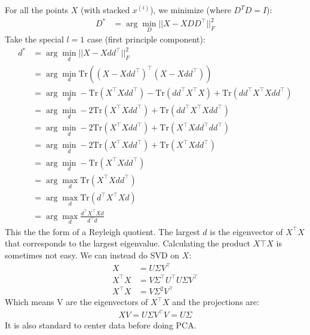 \documentclass{article}
\begin{document}
For all the points $X$ (with stacked $x^{(i)}$), we minimize (where $D^TD = I$):
\begin{align*}
	D^* &= \arg \min_D || X - X D D^\top||_F^2
\end{align*}
Take the special $l=1$ case (first principle component):
\begin{align*}
	d^* &= \arg \min_d || X - X d d^\top||_F^2\\
	&=  \arg \min_d  \text{Tr} ((X - X d d^\top)^\top (X - X d d^\top))\\
	&=  \arg \min_d  -\text{Tr}(X^\top X d d^\top) -\text{Tr}(dd^\top X^\top X) + \text{Tr}(dd^\top X^\top X d d^\top) \\
	&=  \arg \min_d  -2\text{Tr}(X^\top X d d^\top) + \text{Tr}(dd^\top X^\top X d d^\top) \\
	&=  \arg \min_d  -2\text{Tr}(X^\top X d d^\top) + \text{Tr}( X^\top X d d^\top dd^\top) \\
	&=  \arg \min_d  -2\text{Tr}(X^\top X d d^\top) + \text{Tr}( X^\top X d d^\top) \\
    &=  \arg \min_d  -\text{Tr}(X^\top X d d^\top) \\
    &=  \arg \max_d  \text{Tr}(X^\top X d d^\top) \\
    &=  \arg \max_d   \text{Tr}(d^\top X^\top X d)  \\
    &=  \arg \max_d  \frac{d^\top X^\top X d}{d^\top d}
\end{align*}
This the the form of a Reyleigh quotient. The largest $d$ is the eigenvector of $X^\top X$ that corresponds to the largest eigenvalue. Calculating the product $X\top X$ is sometimes not easy. We can instead do SVD on $X$:
\begin{align*}
	X &= U\Sigma V^\top \\
	X^\top X &= V \Sigma^\top U^\top  U \Sigma V^\top\\
	X^\top X &= V\Sigma^2V^\top 
\end{align*}
Which means V are the eigenvectors of $X^\top X$ and the projections are:
\begin{align*}
XV = U\Sigma V^\top V = U\Sigma
\end{align*}
It is also standard to center data before doing PCA.
\end{document}
